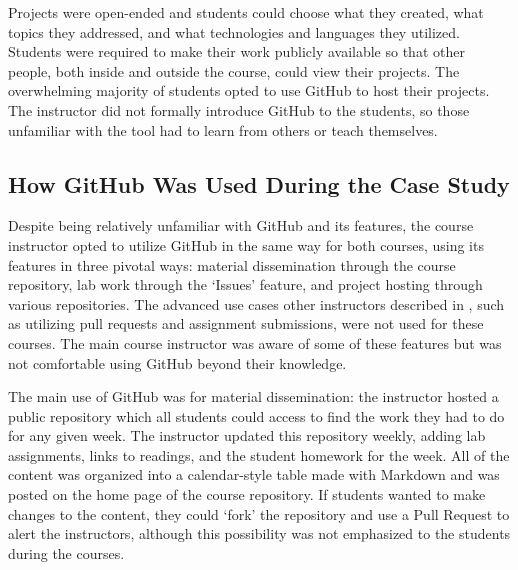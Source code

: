 Projects were open-ended and students could choose what they created, what topics they addressed, and what technologies and languages they utilized. Students were required to make their work publicly available so that other people, both inside and outside the course, could view their projects. The overwhelming majority of students opted to use GitHub to host their projects. The instructor did not formally introduce GitHub to the students, so those unfamiliar with the tool had to learn from others or teach themselves.

\subsection{How GitHub Was Used During the Case Study}
Despite being relatively unfamiliar with GitHub and its features, the course instructor opted to utilize GitHub in the same way for both courses, using its features in three pivotal ways: material dissemination through the course repository, lab work through the `Issues' feature, and project hosting through various repositories. The advanced use cases other instructors described in \cite{zagalsky2015emergence}, such as utilizing pull requests and assignment submissions, were not used for these courses. The main course instructor was aware of some of these features but was not comfortable using GitHub beyond their knowledge.

The main use of GitHub was for material dissemination: the instructor hosted a public repository which all students could access to find the work they had to do for any given week. The instructor updated this repository weekly, adding lab assignments, links to readings, and the student homework for the week. All of the content was organized into a calendar-style table made with Markdown and was posted on the home page of the course repository. If students wanted to make changes to the content, they could `fork' the repository and use a Pull Request to alert the instructors, although this possibility was not emphasized to the students during the courses.

